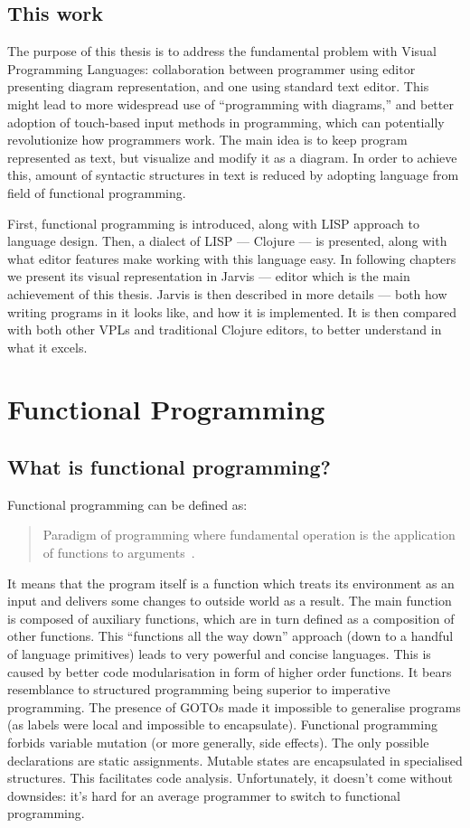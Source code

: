 \documentclass[english,mgr,shortabstract]{iithesis}
\begin{document}
\section{This work}
The purpose of this thesis is to address the fundamental problem with Visual
Programming Languages: collaboration between programmer using editor presenting
diagram representation, and one using standard text editor. This might lead to
more widespread use of ``programming with diagrams,'' and better adoption of
touch-based input methods in programming, which can potentially revolutionize
how programmers work.
The main idea is to keep program represented as text, but visualize and modify
it as a diagram. In order to achieve this, amount of syntactic structures in
text is reduced by adopting language from field of functional programming.

First, functional programming is introduced, along with LISP approach to
language design. Then, a dialect of LISP --- Clojure --- is presented, along
with what editor features make working with this language easy.
In  following chapters we present its
visual representation in Jarvis --- editor which is the main achievement
of this thesis. Jarvis is then described in more details --- both how writing
programs in it looks like, and how it is implemented.
It is then compared with both other VPLs and traditional
Clojure editors, to better understand in what it excels.


\chapter{Functional Programming}
\section{What is functional programming?}
Functional programming can be defined as:
\blockquote{Paradigm of programming where
  fundamental operation is the application of functions to
  arguments~\cite{Hughes:1989:WFP:63410.63411}.}

It means that the program itself is a function which treats its environment as
an input and delivers some changes to outside world as a result.
The main function is composed of auxiliary functions, which are in turn defined
as a composition of other functions.
This ``functions all the way down'' approach (down to a handful of language
primitives) leads to very powerful and concise languages.
This is caused by better code modularisation in form of higher order functions.
It bears resemblance to structured programming being superior to imperative
programming.
The presence of GOTOs made it impossible to generalise programs (as labels were
local and impossible to encapsulate).
Functional programming forbids variable mutation (or more generally, side
effects).
The only possible declarations are static assignments.
Mutable states are encapsulated in specialised structures.
This facilitates code analysis.
Unfortunately, it doesn't come without downsides: it’s hard for an average
programmer to switch to functional programming.
\end{document}

